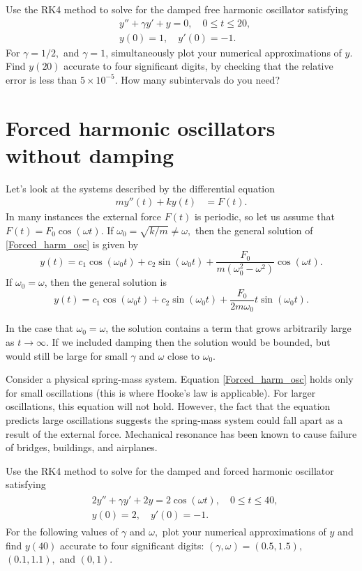 \begin{problem}
Use the RK4 method to solve for the damped free harmonic oscillator satisfying 
\begin{align*}
&{}y'' +\gamma y'+ y = 0, \quad 0 \leq t \leq 20,\\
&{}y(0) = 1, \quad
y'(0) = -1.
\end{align*}
For $\gamma = 1/2,$ and $\gamma = 1$, simultaneously plot your numerical approximations of $y$.  
Find $y(20)$ accurate to four significant digits, by checking that the relative error is less than $5\times 10^{-5}$.  
How many subintervals do you need?
\end{problem}

\section*{Forced harmonic oscillators without damping}
Let's look at the systems described by the differential equation
\begin{align}
my''(t)  + ky(t) &= F(t). \label{Forced_harm_osc}
\end{align}
In many instances the external force $F(t)$ is periodic, so let us assume that $F(t) = F_0 \cos(\omega t)$. 
If $\omega_0 = \sqrt{k/m} \not = \omega,$ then the  general solution of \ref{Forced_harm_osc} is given by
\[y(t) = c_1 \cos (\omega_0 t) + c_2\sin (\omega_0 t) + \frac{F_0}{m(\omega_0^2 - \omega^2)} \cos (\omega t).\]
If $\omega_0 = \omega$, then the general solution is
\[y(t) = c_1 \cos (\omega_0 t) + c_2\sin (\omega_0 t) + \frac{F_0}{2m\omega_0} t \sin (\omega_0 t).\]

In the case that $\omega_0 = \omega$, the solution contains a term that grows arbitrarily large as $t \to \infty$.
If we included damping then the solution would be bounded, but would still be large for small $\gamma$ and $\omega$ close to $\omega_0$.

Consider a physical spring-mass system.
Equation \ref{Forced_harm_osc} holds only for small oscillations (this is where Hooke's law is applicable).
For larger oscillations, this equation will not hold.
However, the fact that the equation predicts large oscillations suggests the spring-mass system could fall apart as a result of the external force. 
Mechanical resonance has been known to cause failure of bridges, buildings, and airplanes.

\begin{problem}
Use the RK4 method to solve for the damped and forced harmonic oscillator satisfying 
\begin{align}
	\begin{split}
&{}2y'' + \gamma y' + 2y = 2 \cos (\omega t), \quad 0 \leq t \leq 40,\\
&{}y(0) = 2, \quad
y'(0) = -1. 
	\end{split}
	\label{ivp:damped_forced_oscillator}
\end{align}
For the following values of $\gamma$ and $\omega,$ plot your numerical approximations of $y$ and find $y(40)$ accurate to four significant digits: $(\gamma, \omega) = (0.5, 1.5),$ $(0.1, 1.1),$ and $(0, 1).$
\end{problem}


